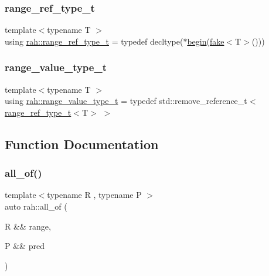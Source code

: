 \mbox{\label{namespacerah_a6622426bea22e9509614fe4c574ebeca}} 
\subsubsection{\texorpdfstring{range\_ref\_type\_t}{range\_ref\_type\_t}}
{\footnotesize\ttfamily template$<$typename T $>$ \\
using \mbox{\hyperlink{namespacerah_a6622426bea22e9509614fe4c574ebeca}{rah\+::range\+\_\+ref\+\_\+type\+\_\+t}} = typedef decltype($\ast$\mbox{\hyperlink{namespacerah_a2c4a19e57cc4e0753e93830f247def6d}{begin}}(\mbox{\hyperlink{namespacerah_a11785bbdf970efa1bc57fc14993b77bf}{fake}}$<$T$>$()))}

\mbox{\label{namespacerah_a4b32e39fb106af7036b20a39c4f024c1}} 
\subsubsection{\texorpdfstring{range\_value\_type\_t}{range\_value\_type\_t}}
{\footnotesize\ttfamily template$<$typename T $>$ \\
using \mbox{\hyperlink{namespacerah_a4b32e39fb106af7036b20a39c4f024c1}{rah\+::range\+\_\+value\+\_\+type\+\_\+t}} = typedef std\+::remove\+\_\+reference\+\_\+t$<$\mbox{\hyperlink{namespacerah_a6622426bea22e9509614fe4c574ebeca}{range\+\_\+ref\+\_\+type\+\_\+t}}$<$T$>$ $>$}



\subsection{Function Documentation}
\mbox{\label{namespacerah_a182308962c8123dcbe4e4665eaef105c}} 
\subsubsection{\texorpdfstring{all\_of()}{all\_of()}\hspace{0.1cm}{\footnotesize\ttfamily [1/2]}}
{\footnotesize\ttfamily template$<$typename R , typename P $>$ \\
auto rah\+::all\+\_\+of (\begin{DoxyParamCaption}\item[{R \&\&}]{range,  }\item[{P \&\&}]{pred }\end{DoxyParamCaption})}



